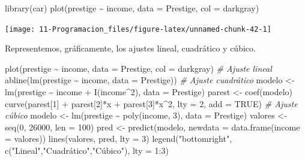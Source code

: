 \documentclass[
]{book}
\newenvironment{Shaded}{\begin{snugshade}}{\end{snugshade}}
\newcommand{\AttributeTok}[1]{\textcolor[rgb]{0.77,0.63,0.00}{#1}}
\newcommand{\CommentTok}[1]{\textcolor[rgb]{0.56,0.35,0.01}{\textit{#1}}}
\newcommand{\ConstantTok}[1]{\textcolor[rgb]{0.00,0.00,0.00}{#1}}
\newcommand{\DecValTok}[1]{\textcolor[rgb]{0.00,0.00,0.81}{#1}}
\newcommand{\FunctionTok}[1]{\textcolor[rgb]{0.00,0.00,0.00}{#1}}
\newcommand{\NormalTok}[1]{#1}
\newcommand{\OtherTok}[1]{\textcolor[rgb]{0.56,0.35,0.01}{#1}}
\newcommand{\SpecialCharTok}[1]{\textcolor[rgb]{0.00,0.00,0.00}{#1}}
\newcommand{\StringTok}[1]{\textcolor[rgb]{0.31,0.60,0.02}{#1}}
\theoremstyle{break}
\theoremstyle{nonumberplain}
\begin{document}
\begin{Shaded}
\begin{Highlighting}[]
\FunctionTok{library}\NormalTok{(car)}
\FunctionTok{plot}\NormalTok{(prestige }\SpecialCharTok{\textasciitilde{}}\NormalTok{ income, }\AttributeTok{data =}\NormalTok{ Prestige, }\AttributeTok{col =} \StringTok{\textquotesingle{}darkgray\textquotesingle{}}\NormalTok{)}
\end{Highlighting}
\end{Shaded}

\begin{center}\texttt{[image: 11-Programacion\_files/figure-latex/unnamed-chunk-42-1]} \end{center}

Representemos, gráficamente, los ajustes lineal, cuadrático y cúbico.

\begin{Shaded}
\begin{Highlighting}[]
\FunctionTok{plot}\NormalTok{(prestige }\SpecialCharTok{\textasciitilde{}}\NormalTok{ income, }\AttributeTok{data =}\NormalTok{ Prestige, }\AttributeTok{col =} \StringTok{\textquotesingle{}darkgray\textquotesingle{}}\NormalTok{)}
\CommentTok{\# Ajuste lineal}
\FunctionTok{abline}\NormalTok{(}\FunctionTok{lm}\NormalTok{(prestige }\SpecialCharTok{\textasciitilde{}}\NormalTok{ income, }\AttributeTok{data =}\NormalTok{ Prestige))}
\CommentTok{\# Ajuste cuadrático}
\NormalTok{modelo }\OtherTok{\textless{}{-}} \FunctionTok{lm}\NormalTok{(prestige }\SpecialCharTok{\textasciitilde{}}\NormalTok{ income }\SpecialCharTok{+} \FunctionTok{I}\NormalTok{(income}\SpecialCharTok{\^{}}\DecValTok{2}\NormalTok{), }\AttributeTok{data =}\NormalTok{ Prestige)}
\NormalTok{parest }\OtherTok{\textless{}{-}} \FunctionTok{coef}\NormalTok{(modelo)}
\FunctionTok{curve}\NormalTok{(parest[}\DecValTok{1}\NormalTok{] }\SpecialCharTok{+}\NormalTok{ parest[}\DecValTok{2}\NormalTok{]}\SpecialCharTok{*}\NormalTok{x }\SpecialCharTok{+}\NormalTok{ parest[}\DecValTok{3}\NormalTok{]}\SpecialCharTok{*}\NormalTok{x}\SpecialCharTok{\^{}}\DecValTok{2}\NormalTok{, }\AttributeTok{lty =} \DecValTok{2}\NormalTok{, }\AttributeTok{add =} \ConstantTok{TRUE}\NormalTok{)}
\CommentTok{\# Ajuste cúbico}
\NormalTok{modelo }\OtherTok{\textless{}{-}} \FunctionTok{lm}\NormalTok{(prestige }\SpecialCharTok{\textasciitilde{}} \FunctionTok{poly}\NormalTok{(income, }\DecValTok{3}\NormalTok{), }\AttributeTok{data =}\NormalTok{ Prestige)}
\NormalTok{valores }\OtherTok{\textless{}{-}} \FunctionTok{seq}\NormalTok{(}\DecValTok{0}\NormalTok{, }\DecValTok{26000}\NormalTok{, }\AttributeTok{len =} \DecValTok{100}\NormalTok{)}
\NormalTok{pred }\OtherTok{\textless{}{-}} \FunctionTok{predict}\NormalTok{(modelo, }\AttributeTok{newdata =} \FunctionTok{data.frame}\NormalTok{(}\AttributeTok{income =}\NormalTok{ valores))}
\FunctionTok{lines}\NormalTok{(valores, pred, }\AttributeTok{lty =} \DecValTok{3}\NormalTok{)}
\FunctionTok{legend}\NormalTok{(}\StringTok{"bottomright"}\NormalTok{, }\FunctionTok{c}\NormalTok{(}\StringTok{"Lineal"}\NormalTok{,}\StringTok{"Cuadrático"}\NormalTok{,}\StringTok{"Cúbico"}\NormalTok{), }\AttributeTok{lty =} \DecValTok{1}\SpecialCharTok{:}\DecValTok{3}\NormalTok{)}
\end{Highlighting}
\end{Shaded}
\end{document}
